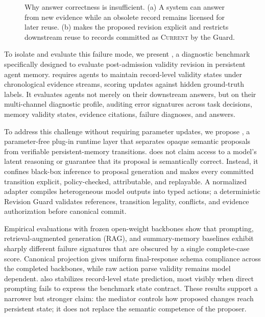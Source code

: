 \begin{figure}[t]
\caption{Why answer correctness is insufficient. (a) A system can answer from new evidence while an obsolete record remains licensed for later reuse. (b) \method{} makes the proposed revision explicit and restricts downstream reuse to records committed as \textsc{Current} by the Guard.}
\label{fig:motivation}
\end{figure}

To isolate and evaluate this failure mode, we present \bench{}, a diagnostic benchmark specifically designed to evaluate post-admission validity revision in persistent agent memory. \bench{} requires agents to maintain record-level validity states under chronological evidence streams, scoring updates against hidden ground-truth labels. It evaluates agents not merely on their downstream answers, but on their multi-channel diagnostic profile, auditing error signatures across task decisions, memory validity states, evidence citations, failure diagnoses, and answers.

To address this challenge without requiring parameter updates, we propose \method{}, a parameter-free plug-in runtime layer that separates opaque semantic proposals from verifiable persistent-memory transitions. \method{} does not claim access to a model's latent reasoning or guarantee that its proposal is semantically correct. Instead, it confines black-box inference to proposal generation and makes every committed transition explicit, policy-checked, attributable, and replayable. A normalized adapter compiles heterogeneous model outputs into typed actions; a deterministic Revision Guard validates references, transition legality, conflicts, and evidence authorization before canonical commit.

Empirical evaluations with frozen open-weight backbones show that prompting, retrieval-augmented generation (RAG), and summary-memory baselines exhibit sharply different failure signatures that are obscured by a single complete-case score. Canonical projection gives \method{} uniform final-response schema compliance across the completed backbones, while raw action parse validity remains model dependent. \method{} also stabilizes record-level state prediction, most visibly when direct prompting fails to express the benchmark state contract. These results support a narrower but stronger claim: the mediator controls how proposed changes reach persistent state; it does not replace the semantic competence of the proposer.

